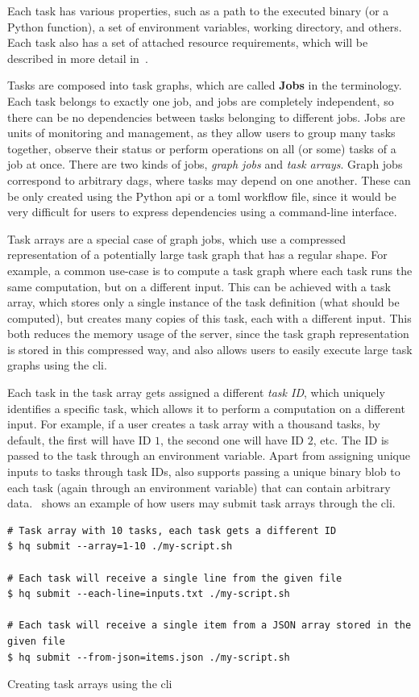 Each task has various properties, such as a path to the executed binary (or a Python function), a
set of environment variables, working directory, and others. Each task also has a set of attached
resource requirements, which will be described in more detail in~.

Tasks are composed into task graphs, which are called \textbf{Jobs} in the
\hq{} terminology. Each task belongs to exactly one job, and jobs are completely
independent, so there can be no dependencies between tasks belonging to different jobs. Jobs are
units of monitoring and management, as they allow users to group many tasks together, observe their
status or perform operations on all (or some) tasks of a job at once. There are two kinds of jobs,
\emph{graph jobs} and \emph{task arrays}. Graph jobs correspond to arbitrary
\glspl{dag}, where tasks may depend on one another. These can be only created using the
Python \gls{api} or a \gls{toml} workflow file, since it would be very
difficult for users to express dependencies using a command-line interface.

Task arrays are a special case of graph jobs, which use a compressed representation of a
potentially large task graph that has a regular shape. For example, a common use-case is to compute
a task graph where each task runs the same computation, but on a different input. This can be
achieved with a task array, which stores only a single instance of the task definition (what should
be computed), but creates many copies of this task, each with a different input. This both reduces
the memory usage of the server, since the task graph representation is stored in this compressed
way, and also allows users to easily execute large task graphs using the \gls{cli}.

Each task in the task array gets assigned a different \emph{task ID}, which uniquely
identifies a specific task, which allows it to perform a computation on a different input. For
example, if a user creates a task array with a thousand tasks, by default, the first will have ID
$1$, the second one will have ID $2$, etc. The ID is passed to
the task through an environment variable. Apart from assigning unique inputs to tasks through task
IDs, \hq{} also supports passing a unique binary blob to each task (again through
an environment variable) that can contain arbitrary data.~ shows an example
of how users may submit task arrays through the \gls{cli}.

\begin{listing}[h]
	\begin{verbatim}
# Task array with 10 tasks, each task gets a different ID
$ hq submit --array=1-10 ./my-script.sh

# Each task will receive a single line from the given file
$ hq submit --each-line=inputs.txt ./my-script.sh

# Each task will receive a single item from a JSON array stored in the given file
$ hq submit --from-json=items.json ./my-script.sh
	\end{verbatim}
	\caption{Creating task arrays using the \hyperqueue{} \gls{cli}}
	\label{lst:hq-cli-task-arrays}
\end{listing}

